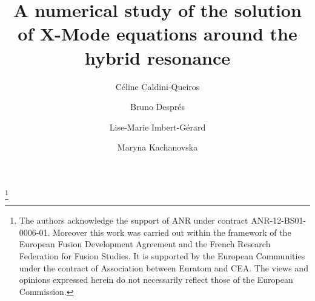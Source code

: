 \documentclass[proc]{edpsmath}
\begin{document}
\newcommand{\urev}[1]{{\color{red}#1}}
\newcommand{\mrev}[1]{{\color{blue}#1}}

\title{A numerical study of the
	solution of X-Mode equations around the hybrid resonance}
\thanks{\rm The authors acknowledge 
	the support
	of ANR under contract ANR-12-BS01-0006-01. Moreover 
	this work was carried out within the framework of the European Fusion Development Agreement and 
	the French Research Federation for Fusion Studies. 
	It is supported by the European Communities under the contract of Association between Euratom and CEA. 
	The views and opinions expressed herein do not necessarily reflect those of the European Commission.} %
%
\author{C\'eline Caldini-Queiros}\address{Max Planck Institute für PlasmaPhysik, Garching bei Muenchen}
\author{Bruno Despr\'es}\address{Sorbonne Universit\'es, UPMC Univ Paris 06, UMR 7598, Laboratoire Jacques-Louis Lions, F-75005, Paris, France}
\author{Lise-Marie Imbert-Gérard}\address{Courant Institute of Mathematical Sciences, New York University}
\author{Maryna Kachanovska}\address{POEMS, INRIA, ENSTA ParisTech, Paris}


%
%
\begin{abstract}

\end{abstract}
%
\begin{resume} 

\end{resume}
%
%
\maketitle


%


%



\end{document}
